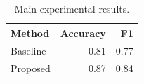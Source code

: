 \begin{table}[t]
  \centering
  \caption{Main experimental results.}
  \label{tab:main-results}
  \begin{tabular}{lrr}
    \toprule
    Method & Accuracy & F1 \\
    \midrule
    Baseline & 0.81 & 0.77 \\
    Proposed & 0.87 & 0.84 \\
    \bottomrule
  \end{tabular}
\end{table}
